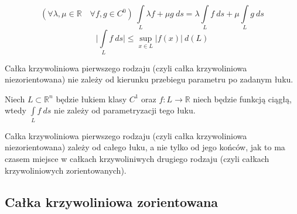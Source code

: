 \begin{tw}
	$$(\forall \lambda, \mu \in \mathbb{R} \quad \forall f,g \in C^{0}) \ \int\limits_L \lambda f+\mu g\ ds=\lambda\int\limits_Lf\ ds+\mu\int\limits_Lg\ ds$$ $$\Big|\int\limits_Lf\ ds\Big|\leq \mathop{sup}_{x\in L}|f(x)|\ d(L)$$
\end{tw}

\begin{uwg}
	Całka krzywoliniowa pierwszego rodzaju (czyli całka krzywoliniowa niezorientowana) nie zależy od kierunku przebiegu parametru po zadanym łuku.
\end{uwg}

\begin{ft}
	Niech $L\subset\mathbb{R}^{n}$ będzie łukiem klasy $C^{1}$ oraz $f:L\rightarrow \mathbb{R}$ niech będzie funkcją ciągłą, wtedy $\displaystyle\int\limits_{L}f\ ds$ nie zależy od parametryzacji tego łuku.
\end{ft}

\begin{uwg}
	Całka krzywoliniowa pierwszego rodzaju (czyli całka krzywoliniowa niezorientowana) zależy od całego łuku, a nie tylko od jego końców, jak to ma czasem miejsce w całkach krzywoliniwych drugiego rodzaju (czyli całkach krzywoliniowych zorientowanych).
\end{uwg}

\subsection{Całka krzywoliniowa zorientowana}

